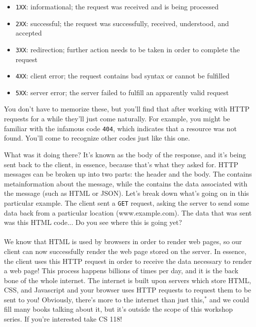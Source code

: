 \begin{itemize}
    \item \texttt{1XX}: informational; the request was received and is being processed
    \item \texttt{2XX}: successful; the request was successfully, received, understood, and accepted
    \item \texttt{3XX}: redirection; further action needs to be taken in order to complete the request
    \item \texttt{4XX}: client error; the request contains bad syntax or cannot be fulfilled
    \item \texttt{5XX}: server error; the server failed to fulfill an apparently valid request
\end{itemize}


You don't have to memorize these, but you'll find that after working with HTTP requests for a while they'll just come naturally. For example, you might be familiar with the infamous code \texttt{404}, which indicates that a resource was not found. You'll come to recognize other codes just like this one.

\begin{kaobox}[title=About the HTML we saw before\dots]
    What was it doing there? It's known as the body of the response, and it's being sent back to the client, in essence, because that's what they asked for. HTTP messages can be broken up into two parts: the header and the body. The  contains metainformation about the message, while the  contains the data associated with the message (such as HTML or JSON). Let's break down what's going on in this particular example.  The client sent a \texttt{GET} request, asking the server to send some data back from a particular location (www.example.com). The data that was sent was this HTML code... Do you see where this is going yet? \\ \\
    We know that HTML is used by browsers in order to render web pages, so our client can now successfully render the web page stored on the server. In essence, the client uses this HTTP request in order to receive the data necessary to render a web page! This process happens billions of times per day, and it is the back bone of the whole internet. The internet is built upon servers which store HTML, CSS, and Javascript and your browser uses HTTP requests to request them to be sent to you! Obviously, there's more to the internet than just this,$^*$ and we could fill many books talking about it, but it's outside the scope of this workshop series. If you're interested take CS 118!
\end{kaobox}

